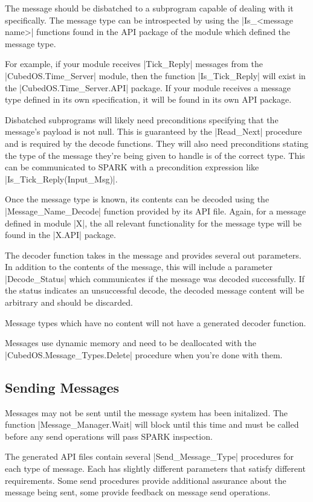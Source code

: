 The message should be disbatched to a subprogram capable of dealing with it specifically.  The message type can be introspected by using the |Is_<message name>| functions found in the API package of the module which defined the message type.

For example, if your module receives |Tick_Reply| messages from the |CubedOS.Time_Server| module, then the function |Is_Tick_Reply| will exist in the |CubedOS.Time_Server.API| package. If your module receives a message type defined in its own specification, it will be found in its own API package.

Disbatched subprograms will likely need preconditions specifying that the message's payload is not null. This is guaranteed by the |Read_Next| procedure and is required by the decode functions. They will also need preconditions stating the type of the message they're being given to handle is of the correct type. This can be communicated to SPARK with a precondition expression like |Is_Tick_Reply(Input_Msg)|.

Once the message type is known, its contents can be decoded using the |Message_Name_Decode| function provided by its API file. Again, for a message defined in module |X|, the all relevant functionality for the message type will be found in the |X.API| package.

The decoder function takes in the message and provides several out parameters. In addition to the contents of the message, this will include a parameter |Decode_Status| which communicates if the message was decoded successfully. If the status indicates an unsuccessful decode, the decoded message content will be arbitrary and should be discarded.

Message types which have no content will not have a generated decoder function.

Messages use dynamic memory and need to be deallocated with the |CubedOS.Message_Types.Delete| procedure when you're done with them.

\subsection{Sending Messages}

Messages may not be sent until the message system has been initalized. The function |Message_Manager.Wait| will block until this time and must be called before any send operations will pass SPARK inspection.

The generated API files contain several |Send_Message_Type| procedures for each type of message. Each has slightly different parameters that satisfy different requirements. Some send procedures provide additional assurance about the message being sent, some provide feedback on message send operations.


